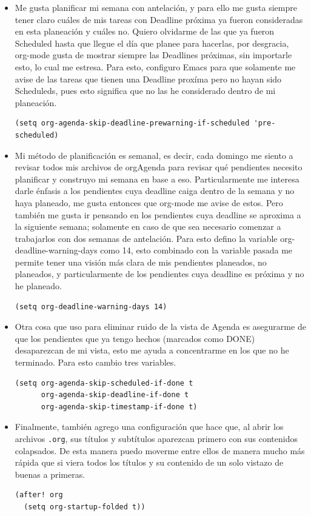 \documentclass[11pt]{article}
\begin{document}
\begin{itemize}
\item Me gusta planificar mi semana con antelación, y para ello me gusta siempre tener claro cuáles de mis tareas con Deadline próxima ya fueron consideradas en esta planeación y cuáles no. Quiero olvidarme de las que ya fueron Scheduled hasta que llegue el día que planee para hacerlas, por desgracia, org-mode gusta de mostrar siempre las Deadlines próximas, sin importarle esto, lo cual me estresa. Para esto, configuro Emacs para que solamente me avise de las tareas que tienen una Deadline proxíma pero no hayan sido Scheduleds, pues esto significa que no las he considerado dentro de mi planeación.

\begin{verbatim}
(setq org-agenda-skip-deadline-prewarning-if-scheduled 'pre-scheduled)
\end{verbatim}

\item Mi método de planificación es semanal, es decir, cada domingo me siento a revisar todos mis archivos de orgAgenda para revisar qué pendientes necesito planificar y construyo mi semana en base a eso. Particularmente me interesa darle énfasis a los pendientes cuya deadline caiga dentro de la semana y no haya planeado, me gusta entonces que org-mode me avise de estos. Pero también me gusta ir pensando en los pendientes cuya deadline se aproxima a la siguiente semana; solamente en caso de que sea necesario comenzar a trabajarlos con dos semanas de antelación. Para esto defino la variable org-deadline-warning-days como 14, esto combinado con la variable pasada me permite tener una visión más clara de mis pendientes planeados, no planeados, y particularmente de los pendientes cuya deadline es próxima y no he planeado.

\begin{verbatim}
(setq org-deadline-warning-days 14)
\end{verbatim}

\item Otra cosa que uso para eliminar ruido de la vista de Agenda es asegurarme de que los pendientes que ya tengo hechos (marcados como DONE) desaparezcan de mi vista, esto me ayuda a concentrarme en los que no he terminado. Para esto cambio tres variables.

\begin{verbatim}
(setq org-agenda-skip-scheduled-if-done t
      org-agenda-skip-deadline-if-done t
      org-agenda-skip-timestamp-if-done t)
\end{verbatim}

\item Finalmente, también agrego una configuración que hace que, al abrir los archivos \texttt{.org}, sus títulos y subtítulos aparezcan primero con sus contenidos colapsados. De esta manera puedo moverme entre ellos de manera mucho más rápida que si viera todos los títulos y su contenido de un solo vistazo de buenas a primeras.

\begin{verbatim}
(after! org
  (setq org-startup-folded t))
\end{verbatim}
\end{itemize}
\end{document}

